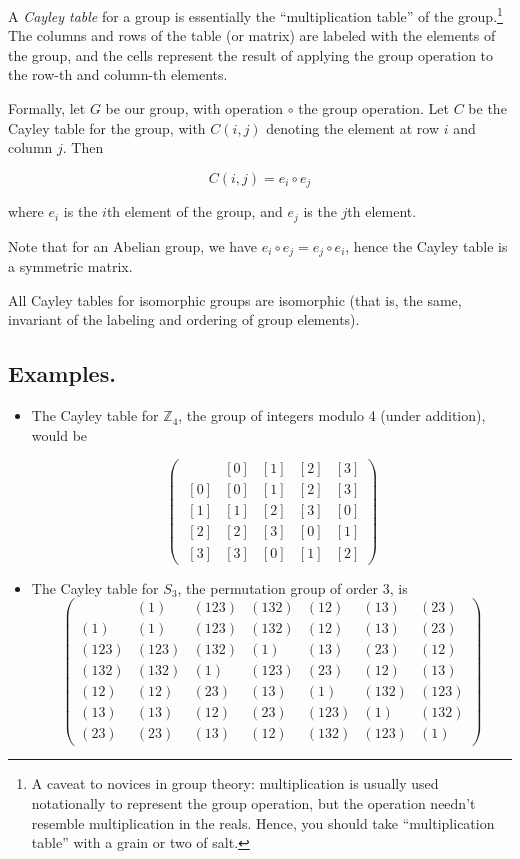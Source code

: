 \documentclass[12pt]{article}
\begin{document}
A \emph{Cayley table} for a group is essentially the ``multiplication table'' of the group.\footnote{A caveat to novices in group theory: multiplication is usually used notationally to represent the group operation, but the operation needn't resemble multiplication in the reals.  Hence, you should take ``multiplication table'' with a grain or two of salt.}  The columns and rows of the table (or matrix) are labeled with the elements of the group, and the cells represent the result of applying the group operation to the row-th and column-th elements.

Formally, let $G$ be our group, with operation $\circ$ the group operation.  Let $C$ be the Cayley table for the group, with $C(i,j)$ denoting the element at row $i$ and column $j$.  Then

$$ C(i,j) = e_i \circ e_j $$

where $e_i$ is the $i$th element of the group, and $e_j$ is the $j$th element.

Note that for an Abelian group, we have $e_i \circ e_j = e_j \circ e_i$, hence the Cayley table is a symmetric matrix.

All Cayley tables for isomorphic groups are isomorphic (that is, the same, invariant of the labeling and ordering of group elements). 

\subsection{Examples.}

\begin{itemize}

\item The Cayley table for $\mathbb{Z}_4$, the group of integers modulo 4 (under addition), would be

$$ \left(\begin{array}{c|cccc}
     & [0] & [1] & [2] & [3] \\
\hline
\; [0] & [0] & [1] & [2] & [3] \\
\; [1] & [1] & [2] & [3] & [0] \\
\; [2] & [2] & [3] & [0] & [1] \\
\; [3] & [3] & [0] & [1] & [2]
\end{array}\right) $$

\item The Cayley table for $S_3$, the permutation group of order 3, is
$$ \left(\begin{array}{c|cccccc}
& (1) & (123) & (132) & (12) & (13) & (23) \\
\hline
(1)  & (1) & (123) & (132) & (12) & (13) & (23) \\
(123) & (123) & (132) & (1) & (13) & (23) & (12) \\
(132) & (132) & (1) & (123) & (23) & (12) & (13) \\
(12) & (12) & (23) & (13) & (1) & (132) & (123) \\
(13) & (13) & (12) & (23) & (123) & (1) & (132) \\
(23) & (23) & (13) & (12) & (132) & (123) & (1)
\end{array}\right) $$

\end{itemize}
\end{document}
